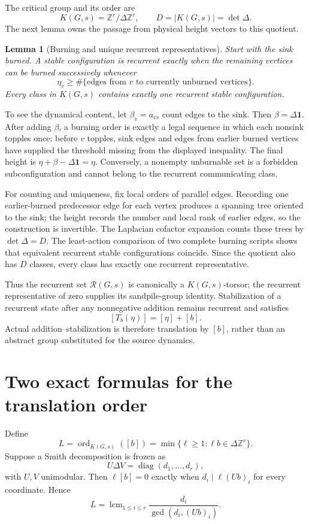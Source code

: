\documentclass[10pt]{article}
\newtheorem{lemma}{Lemma}
\begin{document}
The critical group and its order are
\[
K(G,s)=\mathbb Z^r/\Delta\mathbb Z^r,
\qquad D=|K(G,s)|=\det\Delta.
\]
The next lemma owns the passage from physical height vectors to this quotient.

\begin{lemma}[Burning and unique recurrent representatives]
Start with the sink burned. A stable configuration is recurrent exactly when
the remaining vertices can be burned successively whenever
\[
\eta_v\ge \#\{\text{edges from $v$ to currently unburned vertices}\}.
\]
Every class in $K(G,s)$ contains exactly one recurrent stable configuration.
\end{lemma}

To see the dynamical content, let $\beta_v=a_{vs}$ count edges to the sink.
Then $\beta=\Delta\mathbf1$. After adding $\beta$, a burning order is exactly
a legal sequence in which each nonsink topples once: before $v$ topples, sink
edges and edges from earlier burned vertices have supplied the threshold
missing from the displayed inequality. The final height is
$\eta+\beta-\Delta\mathbf1=\eta$. Conversely, a nonempty unburnable set is a
forbidden subconfiguration and cannot belong to the recurrent communicating
class.

For counting and uniqueness, fix local orders of parallel edges. Recording
one earlier-burned predecessor edge for each vertex produces a spanning tree
oriented to the sink; the height records the number and local rank of earlier
edges, so the construction is invertible. The Laplacian cofactor expansion
counts these trees by $\det\Delta=D$. The least-action comparison of two
complete burning scripts shows that equivalent recurrent stable configurations
coincide. Since the quotient also has $D$ classes, every class has exactly one
recurrent representative.

Thus the recurrent set $\mathcal R(G,s)$ is canonically a $K(G,s)$-torsor;
the recurrent representative of zero supplies its sandpile-group identity.
Stabilization of a recurrent state after any nonnegative addition remains
recurrent and satisfies
\[
[T_b(\eta)]=[\eta]+[b].
\]
Actual addition--stabilization is therefore translation by $[b]$, rather than
an abstract group substituted for the source dynamics.

\section{Two exact formulas for the translation order}
Define
\[
L=\operatorname{ord}_{K(G,s)}([b])
=\min\{\ell\ge1:\ell b\in\Delta\mathbb Z^r\}.
\]
Suppose a Smith decomposition is frozen as
\[
U\Delta V=\operatorname{diag}(d_1,\ldots,d_r),
\]
with $U,V$ unimodular. Then $\ell[b]=0$ exactly when
$d_i\mid\ell(Ub)_i$ for every coordinate. Hence
\begin{equation}\label{eq:smith}
L=\operatorname{lcm}_{1\le i\le r}
\frac{d_i}{\gcd(d_i,(Ub)_i)}.
\end{equation}
\end{document}
